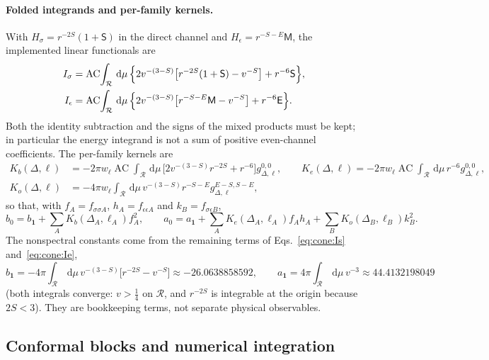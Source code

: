 \documentclass[11pt,a4paper]{article}
\numberwithin{equation}{section}
\newcommand{\dd}{\,\mathrm d}
\newcommand{\AC}{\operatorname{AC}}
\begin{document}
\paragraph{Folded integrands and per-family kernels.} With $H_\sigma=r^{-2S}(1+\mathsf S)$ in the direct channel and
$H_\epsilon=r^{-S-E}\mathsf M$, the implemented linear functionals are
\begin{align}
 I_\sigma&=\AC\!\int_{\mathcal R}\dd\mu\,\Bigl\{2v^{-(3-S)}\bigl[r^{-2S}(1+\mathsf S)-v^{-S}\bigr]+r^{-6}\mathsf S\Bigr\},
 \label{eq:cone:Is}\\
 I_\epsilon&=\AC\!\int_{\mathcal R}\dd\mu\,\Bigl\{2v^{-(3-S)}\bigl[r^{-S-E}\mathsf M-v^{-S}\bigr]+r^{-6}\mathsf E\Bigr\}.
 \label{eq:cone:Ie}
\end{align}
Both the identity subtraction and the signs of the mixed products must be kept; in particular the energy integrand is
not a sum of positive even-channel coefficients. The per-family kernels are
\begin{equation}
\begin{aligned}
 K_b(\Delta,\ell)&=-2\pi w_\ell\AC\!\int_{\mathcal R}\dd\mu\,\bigl[2v^{-(3-S)}r^{-2S}+r^{-6}\bigr]g_{\Delta,\ell}^{0,0},\qquad
 K_e(\Delta,\ell)=-2\pi w_\ell\AC\!\int_{\mathcal R}\dd\mu\,r^{-6}g_{\Delta,\ell}^{0,0},\\
 K_o(\Delta,\ell)&=-4\pi w_\ell\int_{\mathcal R}\dd\mu\,v^{-(3-S)}r^{-S-E}g_{\Delta,\ell}^{E-S,S-E},
\end{aligned}
 \label{eq:cone:kernels}
\end{equation}
so that, with $f_A=f_{\sigma\sigma A}$, $h_A=f_{\epsilon\epsilon A}$ and $k_B=f_{\sigma\epsilon B}$,
\begin{equation}
 b_0=b_{\mathbf 1}+\sum_AK_b(\Delta_A,\ell_A)f_A^2,\qquad
 a_0=a_{\mathbf 1}+\sum_AK_e(\Delta_A,\ell_A)f_Ah_A+\sum_BK_o(\Delta_B,\ell_B)k_B^2 .
 \label{eq:cone:decomp}
\end{equation}
The nonspectral constants come from the remaining terms of Eqs.~\eqref{eq:cone:Is} and~\eqref{eq:cone:Ie},
\begin{equation}
 b_{\mathbf 1}=-4\pi\!\int_{\mathcal R}\dd\mu\,v^{-(3-S)}\bigl[r^{-2S}-v^{-S}\bigr]\approx-26.0638858592,\qquad
 a_{\mathbf 1}=4\pi\!\int_{\mathcal R}\dd\mu\,v^{-3}\approx44.4132198049
\end{equation}
(both integrals converge: $v>\frac14$ on $\mathcal R$, and $r^{-2S}$ is integrable at the origin because $2S<3$). They are bookkeeping terms, not separate physical
observables.

\subsection{Conformal blocks and numerical integration}\label{app:cone:blocks}
\end{document}
